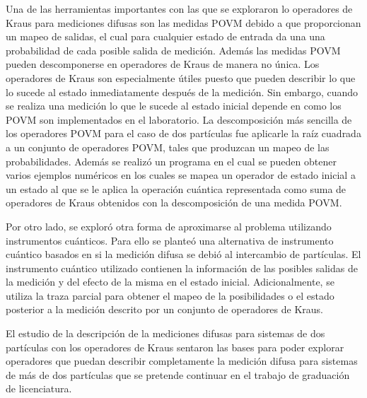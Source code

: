 Una de las herramientas importantes con las que se exploraron lo operadores de Kraus para mediciones difusas son las medidas POVM debido a que proporcionan un mapeo de salidas, el cual para cualquier estado de entrada da una una probabilidad de cada posible salida de medición. Además las medidas POVM pueden descomponerse en operadores de Kraus de manera no única. Los operadores de Kraus son especialmente útiles puesto que pueden describir lo que lo sucede al estado inmediatamente después de la medición. Sin embargo, cuando se realiza una medición lo que le sucede al estado inicial depende en como los POVM son implementados en el laboratorio. La descomposición más sencilla de los operadores POVM para el caso de dos partículas fue aplicarle la raíz cuadrada a un conjunto de operadores POVM, tales que produzcan un mapeo de las probabilidades. Además se realizó un programa en el cual se pueden obtener varios ejemplos numéricos en los cuales se mapea un operador de estado inicial a un estado al que se le aplica la operación cuántica representada como suma de operadores de Kraus obtenidos con la descomposición de una medida POVM\@.

Por otro lado, se exploró otra forma de aproximarse al problema utilizando instrumentos cuánticos. Para ello se planteó una alternativa de instrumento cuántico basados en si la medición difusa se debió al intercambio de partículas. %
 El instrumento cuántico utilizado contienen la información de las posibles salidas de la medición  y del efecto de la misma en el estado inicial. Adicionalmente, se utiliza la traza parcial para obtener el mapeo de la posibilidades o el estado posterior a la medición descrito por un conjunto de operadores de Kraus.

El estudio de la descripción de la mediciones difusas para sistemas de dos partículas con los operadores de Kraus sentaron las bases para poder explorar operadores que puedan describir completamente la medición difusa para sistemas de más de dos partículas que se pretende continuar en el trabajo de graduación de licenciatura.
